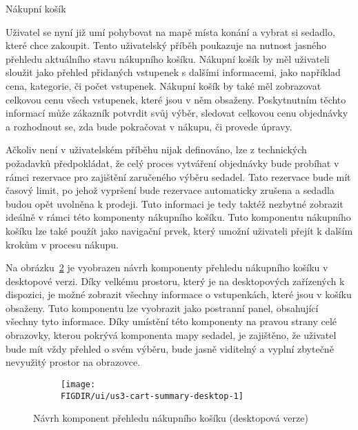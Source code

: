 \begin{subsection}{Nákupní košík}
    \label{subsec:narvh-ui-transformace-uzivatelskych-pribehu-nakupni-kosik}
    \userstoryshoppingcart

    Uživatel se nyní již umí pohybovat na mapě místa konání a vybrat si sedadlo, které chce zakoupit.
    Tento uživatelský příběh poukazuje na nutnost jasného přehledu aktuálního stavu nákupního košíku.
    Nákupní košík by měl uživateli sloužit jako přehled přidaných vstupenek s dalšími informacemi, jako například cena, kategorie, či počet vstupenek.
    Nákupní košík by také měl zobrazovat celkovou cenu všech vstupenek, které jsou v něm obsaženy.
    Poskytnutním těchto informací může zákazník potvrdit svůj výběr, sledovat celkovou cenu objednávky a rozhodnout se, zda bude pokračovat v nákupu, či provede úpravy.

    Ačkoliv není v uživatelském příběhu nijak definováno, lze z technických požadavků předpokládat, že celý proces vytváření objednávky bude probíhat v rámci rezervace pro zajištění zaručeného výběru sedadel.
    Tato rezervace bude mít časový limit, po jehož vypršení bude rezervace automaticky zrušena a sedadla budou opět uvolněna k prodeji.
    Tuto informaci je tedy taktéž nezbytné zobrazit ideálně v rámci této komponenty nákupního košíku.
    Tuto komponentu nákupního košíku lze také použít jako navigační prvek, který umožní uživateli přejít k dalším krokům v procesu nákupu.

    Na obrázku~\ref{fig:us3-cart-summary-desktop} je vyobrazen návrh komponenty přehledu nákupního košíku v desktopové verzi.
    Díky velkému prostoru, který je na desktopových zařízených k dispozici, je možné zobrazit všechny informace o vstupenkách, které jsou v košíku obsaženy.
    Tuto komponentu lze vyobrazit jako postranní panel, obsahující všechny tyto informace.
    Díky umístění této komponenty na pravou strany celé obrazovky, kterou pokrývá komponenta mapy sedadel, je zajištěno, že uživatel bude mít vždy přehled o svém výběru, bude jasně viditelný a vyplní zbytečně nevyužitý prostor na obrazovce.

    \begin{figure}[H]
        \centering
        \begin{subfigure}{\textwidth}
            \texttt{[image: \\FIGDIR/ui/us3-cart-summary-desktop-1]}
            \label{fig:uus3-cart-summary-desktop-1}
        \end{subfigure}
        \caption{Návrh komponent přehledu nákupního košíku (desktopová verze)}
        \label{fig:us3-cart-summary-desktop}
    \end{figure}


\end{subsection}
